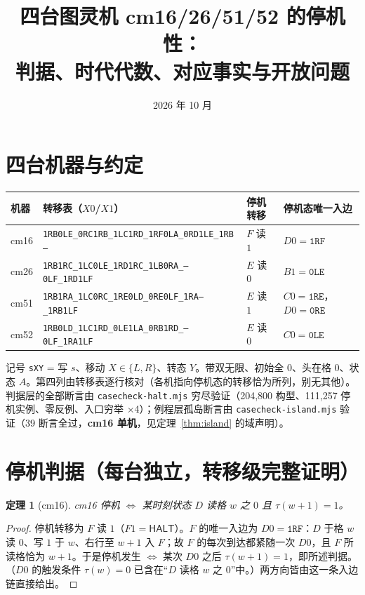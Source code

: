 \documentclass[11pt]{ctexart}
\title{\bfseries 四台图灵机 cm16/26/51/52 的停机性：\\ \large 判据、时代代数、对应事实与开放问题}
\author{}
\date{2026 年 10 月}
\newtheorem{theorem}{定理}[section]
\newcommand{\HALT}{\textsf{HALT}}
\begin{document}
\maketitle

\section{四台机器与约定}

\begin{center}\small
\begin{tabular}{llll}
\toprule
机器 & 转移表（$X0$/$X1$） & 停机转移 & 停机态唯一入边\\
\midrule
cm16 & \texttt{1RB0LE\_0RC1RB\_1LC1RD\_1RF0LA\_0RD1LE\_1RB---} & $F$ 读 $1$ & $D0=\texttt{1RF}$\\
cm26 & \texttt{1RB1RC\_1LC0LE\_1RD1RC\_1LB0RA\_---0LF\_1RD1LF} & $E$ 读 $0$ & $B1=\texttt{0LE}$\\
cm51 & \texttt{1RB1RA\_1LC0RC\_1RE0LD\_0RE0LF\_1RA---\_1RB1LF} & $E$ 读 $1$ & $C0=\texttt{1RE}$，$D0=\texttt{0RE}$\\
cm52 & \texttt{1RB0LD\_1LC1RD\_0LE1LA\_0RB1RD\_---0LF\_1RA1LF} & $E$ 读 $0$ & $C0=\texttt{0LE}$\\
\bottomrule
\end{tabular}
\end{center}

记号 \texttt{sXY} = 写 $s$、移动 $X\in\{L,R\}$、转态 $Y$。带双无限、初始全 0、头在格 0、状态 $A$。第四列由转移表逐行核对（各机指向停机态的转移恰为所列，别无其他）。判据层的全部断言由 \texttt{casecheck-halt.mjs} 穷尽验证（204,800 构型、111,257 停机实例、零反例、入口穷举 $\times$4）；例程层孤岛断言由 \texttt{casecheck-island.mjs} 验证（39 断言全过，\textbf{cm16 单机}，见定理~\ref{thm:island} 的域声明）。

\section{停机判据（每台独立，转移级完整证明）}

\begin{theorem}[cm16]\label{thm:h16}
cm16 停机 $\iff$ 某时刻状态 $D$ 读格 $w$ 之 $0$ 且 $\tau(w{+}1)=1$。
\end{theorem}
\begin{proof}
停机转移为 $F$ 读 $1$（$F1=\HALT$）。$F$ 的唯一入边为 $D0=\texttt{1RF}$：$D$ 于格 $w$ 读 $0$、写 $1$ 于 $w$、右行至 $w{+}1$ 入 $F$；故 $F$ 的每次到达都紧随一次 $D0$，且 $F$ 所读格恰为 $w{+}1$。于是停机发生 $\iff$ 某次 $D0$ 之后 $\tau(w{+}1)=1$，即所述判据。（$D0$ 的触发条件 $\tau(w)=0$ 已含在``$D$ 读格 $w$ 之 $0$''中。）两方向皆由这一条入边链直接给出。
\end{proof}
\end{document}
